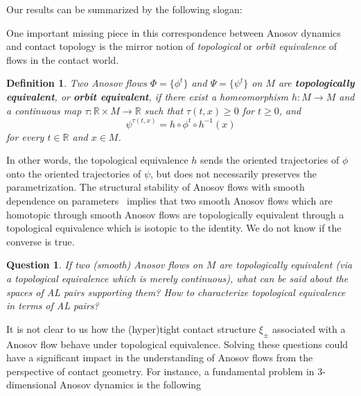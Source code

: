 \documentclass[letterpaper, 11pt]{article}
\numberwithin{equation}{section}
\newtheorem{question}{Question}
\newtheorem{defn}[thm]{Definition}
\newcommand{\R}{\mathbb{R}}
\begin{document}
Our results can be summarized by the following slogan:

\bigskip

    \noindent{}

\bigskip

One important missing piece in this correspondence between Anosov dynamics and contact topology is the mirror notion of \emph{topological} or \emph{orbit equivalence} of flows in the contact world.

\begin{defn} Two Anosov flows $\Phi = \{ \phi^t\}$ and $\Psi= \{ \psi^t\}$ on $M$ are \textbf{topologically equivalent}, or \textbf{orbit equivalent}, if there exist a homeomorphism $h: M \rightarrow M$ and a continuous map $\tau : \R \times M \rightarrow \R$ such that $\tau(t,x) \geq 0$ for $t \geq 0$, and $$\psi^{\tau(t,x)} = h \circ \phi^t \circ h^{-1}(x)$$ for every $t \in \R$ and $x \in M$.
\end{defn}

In other words, the topological equivalence $h$ sends the oriented trajectories of $\phi$ onto the oriented trajectories of $\psi$, but does not necessarily preserves the parametrization. The structural stability of Anosov flows with smooth dependence on parameters~\cite[Theorem A.1]{LMM} implies that two smooth Anosov flows which are homotopic through smooth Anosov flows are topologically equivalent through a topological equivalence which is isotopic to the identity. We do not know if the converse is true.

\begin{question} If two (smooth) Anosov flows on $M$ are topologically equivalent (via a topological equivalence which is merely continuous), what can be said about the spaces of AL pairs supporting them? How to characterize topological equivalence in terms of AL pairs?
\end{question}

It is not clear to us how the (hyper)tight contact structure $\xi_\pm$ associated with a Anosov flow behave under topological equivalence. Solving these questions could have a significant impact in the understanding of Anosov flows from the perspective of contact geometry. For instance, a fundamental problem in $3$-dimensional Anosov dynamics is the following
\end{document}
